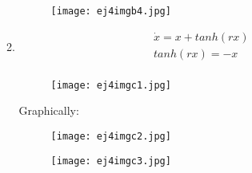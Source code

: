 \documentclass[a4paper,10pt]{article}
\begin{document}
\begin{enumerate}
\begin{enumerate}
                \begin{figure}[h]
                    \centering
                    \texttt{[image: ej4imgb4.jpg]}
                    \label{fig:mesh1}
                \end{figure}
                \newpage
                
            \item
                \begin{equation}
                    \begin{aligned}
                        \dot{x}= x + tanh(rx)\\
                        tanh(rx)= -x\\
                    \end{aligned}
                
                \end{equation}
                \begin{figure}[h]
                    \centering
                    \texttt{[image: ej4imgc1.jpg]}
                    \label{fig:mesh1}
                \end{figure}
                \newpage
                Graphically:
                \begin{figure}[h]
                    \centering
                    \texttt{[image: ej4imgc2.jpg]}
                    \label{fig:mesh1}
                \end{figure}
                \begin{figure}[h]
                    \centering
                    \texttt{[image: ej4imgc3.jpg]}
                    \label{fig:mesh1}
                \end{figure}
                

\end{enumerate}
\end{enumerate}
\end{document}
